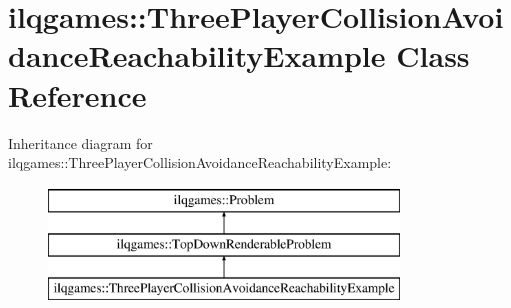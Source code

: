 \hypertarget{classilqgames_1_1_three_player_collision_avoidance_reachability_example}{}\section{ilqgames\+:\+:Three\+Player\+Collision\+Avoidance\+Reachability\+Example Class Reference}
\label{classilqgames_1_1_three_player_collision_avoidance_reachability_example}
Inheritance diagram for ilqgames\+:\+:Three\+Player\+Collision\+Avoidance\+Reachability\+Example\+:\begin{figure}[H]
\begin{center}
\leavevmode
\includegraphics[height=3.000000cm]{classilqgames_1_1_three_player_collision_avoidance_reachability_example}
\end{center}
\end{figure}
